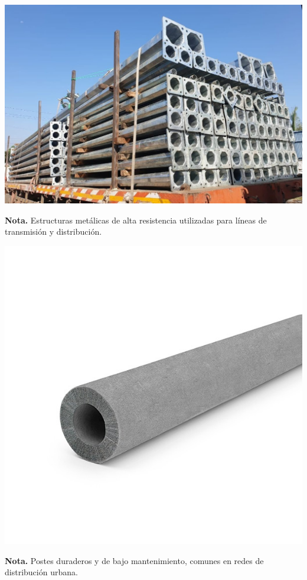 \noindent
\begin{minipage}[t]{0.48\textwidth}
    \centering
    \includegraphics[width=\linewidth]{fotosherrajes/postes acero.jpg}
    \footnotesize
    \raggedright
    \textbf{Nota.} Estructuras metálicas de alta resistencia utilizadas para líneas de transmisión y distribución.
\end{minipage}%
\hfill
\begin{minipage}[t]{0.48\textwidth}
    \centering
    \includegraphics[width=\linewidth]{fotosherrajes/postes concreto.jpg}
    \footnotesize
    \raggedright
    \textbf{Nota.} Postes duraderos y de bajo mantenimiento, comunes en redes de distribución urbana.
\end{minipage}

